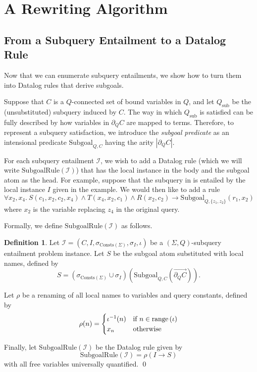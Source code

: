 \documentclass[12pt]{report}
\theoremstyle{plain}
\theoremstyle{definition}
\newtheorem{definition}[theorem]{Definition}
\def\Consts{{\mathrm{Consts}}}
\newcommand{\range}[1]{\ensuremath{\normalfont{\operatorname{range}} \left( #1 \right)}}
\begin{document}
\section{A Rewriting Algorithm}
\label{a-rewriting-algorithm}

\subsection{From a Subquery Entailment to a Datalog Rule}
\label{subquery-entailment-to-datalog-rule}

Now that we can enumerate subquery entailments, we show how to turn them into Datalog rules that derive subgoals.

Suppose that $C$ is a $Q$-connected set of bound variables in $Q$, and let $Q_\mathrm{sub}$ be the (unsubstituted) subquery induced by $C$. The way in which $Q_\mathrm{sub}$ is satisfied can be fully described by how variables in $\partial_Q C$ are mapped to terms. Therefore, to represent a subquery satisfaction, we introduce the \emph{subgoal predicate} as an intensional predicate $\mathrm{Subgoal}_{Q, C}$ having the arity $|\partial_Q C|$.

For each subquery entailment $\mathcal{I}$, we wish to add a Datalog rule (which we will write $\mathrm{SubgoalRule}(\mathcal{I})$) that has the local instance in the body and the subgoal atom as the head.
For example, suppose that the subquery in  is entailed by the local instance $I$ given in the example. We would then like to add a rule $$
  \forall x_2, x_4.\ S(c_1, x_2, c_2, x_4) \wedge T(x_4, x_2, c_1) \wedge R(x_2, c_2) \rightarrow \mathrm{Subgoal}_{Q, \{z_1, z_2\}}(r_1, x_2)
$$
where $x_2$ is the variable replacing $z_4$ in the original query.

Formally, we define $\mathrm{SubgoalRule}(\mathcal{I})$ as follows.

\begin{definition}
\label{definition:subgoal-rule}
  Let $\mathcal{I} = (C, I, \sigma_{\Consts(\Sigma)}, \sigma_I, \iota)$ be a $(\Sigma, Q)$-subquery entailment problem instance. Let $S$ be the subgoal atom substituted with local names, defined by $$
    S = (\sigma_{\Consts(\Sigma)} \cup \sigma_I)\left(\mathrm{Subgoal}_{Q, C}\left(\overrightarrow{\partial_Q C}\right)\right).
  $$

  Let $\rho$ be a renaming of all local names to variables and query constants, defined by $$
    \rho(n) = \begin{cases}
      \iota^{-1}(n) & \text{if } n \in \range{\iota} \\
      x_n & \text{otherwise}
    \end{cases}
  $$

  Finally, let $\mathrm{SubgoalRule}(\mathcal{I})$ be the Datalog rule given by $$
    \mathrm{SubgoalRule}(\mathcal{I}) = \rho\left(I \rightarrow S\right)
  $$ with all free variables universally quantified.
  \qed
\end{definition}
\end{document}
